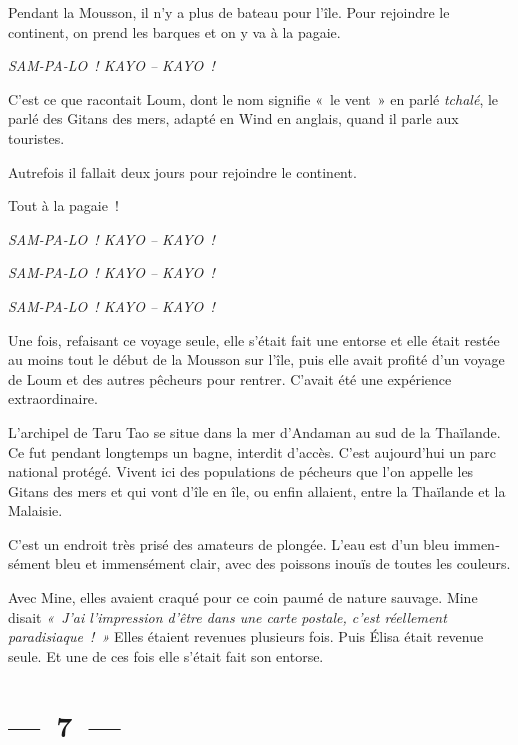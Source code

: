 \documentclass[french,twoside]{book} %
\begin{document}
\noindent Pendant la Mousson, il n’y a plus de bateau pour l’île. Pour rejoindre le continent, on prend les barques et on y va à la pagaie.\par
{\centering\itshape \noindent SAM-PA-LO ! KAYO – KAYO !\par}
\noindent C’est ce que racontait Loum, dont le nom signifie « le vent » en parlé \emph{tchalé}, le parlé des Gitans des mers, adapté en Wind en anglais, quand il parle aux touristes.\par
Autrefois il fallait deux jours pour rejoindre le continent.\par
Tout à la pagaie !\par
{\centering\itshape \noindent SAM-PA-LO ! KAYO – KAYO !\par}
{\centering\itshape \noindent SAM-PA-LO ! KAYO – KAYO !\par}
{\centering\itshape \noindent SAM-PA-LO ! KAYO – KAYO !\par}
\bigbreak
\noindent Une fois, refaisant ce voyage seule, elle s’était fait une entorse et elle était restée au moins tout le début de la Mousson sur l’île, puis elle avait profité d’un voyage de Loum et des autres pêcheurs pour rentrer. C’avait été une expérience extraordinaire.\par
L’archipel de Taru Tao se situe dans la mer d’Andaman au sud de la Thaïlande. Ce fut pendant longtemps un bagne, interdit d’accès. C’est aujourd’hui un parc national protégé. Vivent ici des populations de pécheurs que l’on appelle les Gitans des mers et qui vont d’île en île, ou enfin allaient, entre la Thaïlande et la Malaisie.\par
C’est un endroit très prisé des amateurs de plongée. L’eau est d’un bleu immen­sément bleu et immensément clair, avec des poissons inouïs de toutes les couleurs.\par
Avec Mine, elles avaient craqué pour ce coin paumé de nature sauvage. Mine disait \emph{« J’ai l’impression d’être dans une carte postale, c’est réellement paradisiaque ! »} Elles étaient revenues plusieurs fois. Puis Élisa était revenue seule. Et une de ces fois elle s’était fait son entorse.

\section[{— 7 —}]{— 7 —}
\renewcommand{\leftmark}{— 7 —}
\end{document}
